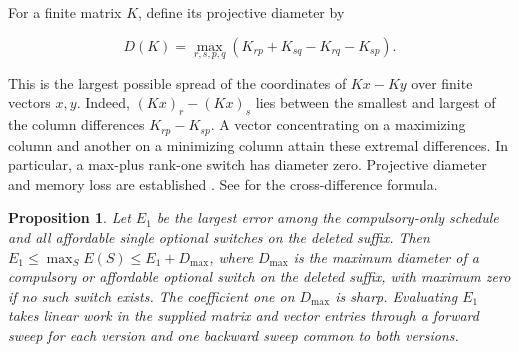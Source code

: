 \documentclass[11pt,letterpaper]{article}
\newtheorem{appprop}{Proposition}[section]
\begin{document}
For a finite matrix $K$, define its projective diameter by

\[
D(K)=\max_{r,s,p,q}(K_{rp}+K_{sq}-K_{rq}-K_{sp}).
\]

This is the largest possible spread of the coordinates of $Kx-Ky$ over finite vectors $x,y$. Indeed, $(Kx)_r-(Kx)_s$ lies between the smallest and largest of the column differences $K_{rp}-K_{sp}$. A vector concentrating on a maximizing column and another on a minimizing column attain these extremal differences. In particular, a max-plus rank-one switch has diameter zero. Projective diameter and memory loss are established \citep{Mairesse1997,Merlet2010}. See \citet[\S2]{Depersin2017} for the cross-difference formula.

\begin{appprop}
\label{prop:sync_suffix}
Let $E_1$ be the largest error among the compulsory-only schedule and all affordable single optional switches on the deleted suffix. Then $E_1\le\max_S E(S)\le E_1+D_{\max}$, where $D_{\max}$ is the maximum diameter of a compulsory or affordable optional switch on the deleted suffix, with maximum zero if no such switch exists. The coefficient one on $D_{\max}$ is sharp. Evaluating $E_1$ takes linear work in the supplied matrix and vector entries through a forward sweep for each version and one backward sweep common to both versions.
\end{appprop}
\end{document}
